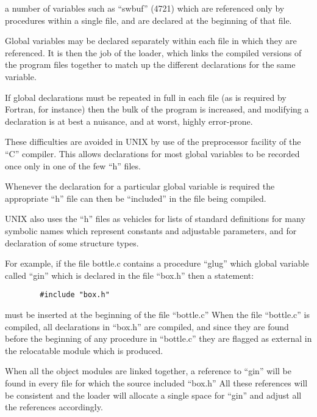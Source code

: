 \item[(b)] a number of variables such as
``swbuf'' (4721) which are referenced 
only by procedures within
a single file, and are declared
at the beginning of that file.
\ed

Global variables may be declared
separately within each file in which
they are referenced. It is then the job
of the loader, which links the compiled
versions of the program files together
to match up the different declarations
for the same variable.



If global declarations must be repeated
in full in each file (as is required by
Fortran, for instance) then the bulk of
the program is increased, and modifying
a declaration is at best a nuisance,
and at worst, highly error-prone.

These difficulties are avoided in UNIX
by use of the preprocessor facility of
the ``C'' compiler. This allows declarations 
for most global variables to be
recorded once only in one of the few
``h'' files.


Whenever the declaration for a particular 
global variable is required the
appropriate ``h'' file can then be
``included'' in the file being compiled.

UNIX also uses the ``h'' files as vehicles 
for lists of standard definitions
for many symbolic names which represent
constants and adjustable parameters,
and for declaration of some structure
types.

For example, if the file bottle.c
contains a procedure ``glug'' which
global variable called
``gin'' which is declared in the file
``box.h'' then a statement:

\begin{verbatim}
        #include "box.h"
\end{verbatim}

\noindent must be inserted at the beginning of
the file ``bottle.c'' When the file
``bottle.c'' is compiled, all declarations 
in ``box.h'' are compiled, and
since they are found before the beginning 
of any procedure in ``bottle.c''
they are flagged as external in the
relocatable module which is produced.

When all the object modules are linked
together, a reference to ``gin'' will be
found in every file for which the
source included ``box.h'' All these
references will be consistent and the
loader will allocate a single space for
``gin'' and adjust all the references
accordingly.


